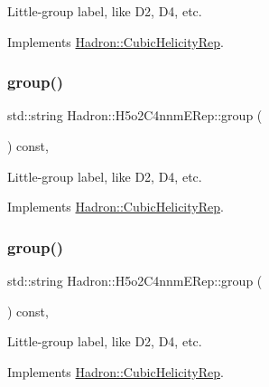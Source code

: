Little-\/group label, like D2, D4, etc. 

Implements \mbox{\hyperlink{structHadron_1_1CubicHelicityRep_a101a7d76cd8ccdad0f272db44b766113}{Hadron\+::\+Cubic\+Helicity\+Rep}}.

\mbox{\label{structHadron_1_1H5o2C4nnmERep_aa8513a91bb6679841b0cae22000013c0}} 
\subsubsection{\texorpdfstring{group()}{group()}\hspace{0.1cm}{\footnotesize\ttfamily [2/3]}}
{\footnotesize\ttfamily std\+::string Hadron\+::\+H5o2\+C4nnm\+E\+Rep\+::group (\begin{DoxyParamCaption}{ }\end{DoxyParamCaption}) const\hspace{0.3cm}{\ttfamily [inline]}, {\ttfamily [virtual]}}

Little-\/group label, like D2, D4, etc. 

Implements \mbox{\hyperlink{structHadron_1_1CubicHelicityRep_a101a7d76cd8ccdad0f272db44b766113}{Hadron\+::\+Cubic\+Helicity\+Rep}}.

\mbox{\label{structHadron_1_1H5o2C4nnmERep_aa8513a91bb6679841b0cae22000013c0}} 
\subsubsection{\texorpdfstring{group()}{group()}\hspace{0.1cm}{\footnotesize\ttfamily [3/3]}}
{\footnotesize\ttfamily std\+::string Hadron\+::\+H5o2\+C4nnm\+E\+Rep\+::group (\begin{DoxyParamCaption}{ }\end{DoxyParamCaption}) const\hspace{0.3cm}{\ttfamily [inline]}, {\ttfamily [virtual]}}

Little-\/group label, like D2, D4, etc. 

Implements \mbox{\hyperlink{structHadron_1_1CubicHelicityRep_a101a7d76cd8ccdad0f272db44b766113}{Hadron\+::\+Cubic\+Helicity\+Rep}}.

